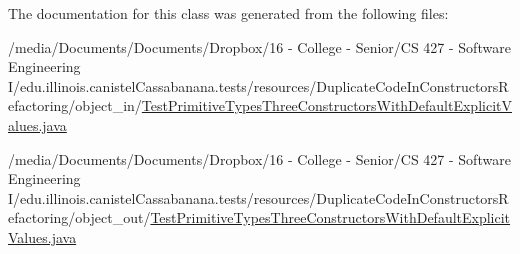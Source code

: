 The documentation for this class was generated from the following files:\begin{DoxyCompactItemize}
\item 
/media/Documents/Documents/Dropbox/16 -\/ College -\/ Senior/CS 427 -\/ Software Engineering I/edu.illinois.canistelCassabanana.tests/resources/DuplicateCodeInConstructorsRefactoring/object\_\-in/\hyperlink{object__in_2TestPrimitiveTypesThreeConstructorsWithDefaultExplicitValues_8java}{TestPrimitiveTypesThreeConstructorsWithDefaultExplicitValues.java}\item 
/media/Documents/Documents/Dropbox/16 -\/ College -\/ Senior/CS 427 -\/ Software Engineering I/edu.illinois.canistelCassabanana.tests/resources/DuplicateCodeInConstructorsRefactoring/object\_\-out/\hyperlink{object__out_2TestPrimitiveTypesThreeConstructorsWithDefaultExplicitValues_8java}{TestPrimitiveTypesThreeConstructorsWithDefaultExplicitValues.java}\end{DoxyCompactItemize}
